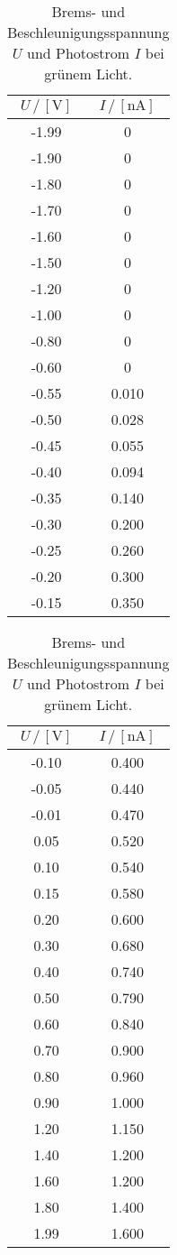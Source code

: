 \begin{table}
  \centering
  \caption{Brems- und Beschleunigungsspannung $U$ und Photostrom $I$ bei grünem Licht.}
  \begin{tabular}{|c|c|}
    \toprule
    $U \,/\, [\si{\volt}]$ & $I \,/\, [\si{\nano\ampere}]$\\
    \midrule
    -1.99 & 0\\
    -1.90 & 0\\
    -1.80 & 0\\
    -1.70 & 0\\
    -1.60 & 0\\
    -1.50 & 0\\
    -1.20 & 0\\
    -1.00 & 0\\
    -0.80 & 0\\
    -0.60 & 0\\
    -0.55 & 0.010\\
    -0.50 & 0.028\\
    -0.45 & 0.055\\
    -0.40 & 0.094\\
    -0.35 & 0.140\\
    -0.30 & 0.200\\
    -0.25 & 0.260\\
    -0.20 & 0.300\\
    -0.15 & 0.350\\
    \bottomrule
  \end{tabular}
  \begin{tabular}{|c|c|}
    \toprule
    $U \,/\, [\si{\volt}]$ & $I \,/\, [\si{\nano\ampere}]$\\
    \midrule
    -0.10 & 0.400\\
    -0.05 & 0.440\\
    -0.01 & 0.470\\
    0.05 & 0.520\\
    0.10 & 0.540\\
    0.15 & 0.580\\
    0.20 & 0.600\\
    0.30 & 0.680\\
    0.40 & 0.740\\
    0.50 & 0.790\\
    0.60 & 0.840\\
    0.70 & 0.900\\
    0.80 & 0.960\\
    0.90 & 1.000\\
    1.20 & 1.150\\
    1.40 & 1.200\\
    1.60 & 1.200\\
    1.80 & 1.400\\
    1.99 & 1.600\\
    \bottomrule
  \end{tabular}
  \label{tab:gruen}
\end{table}

